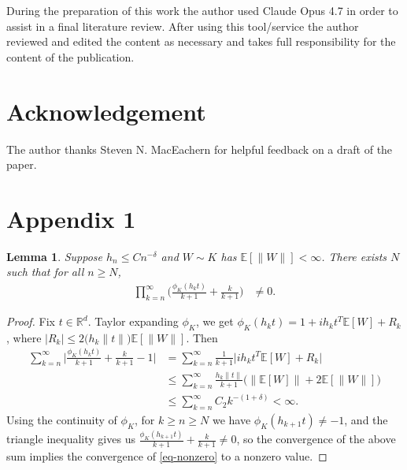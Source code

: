 \documentclass[12pt]{article}
\newtheorem{lemma}{Lemma}
\newcommand{\R}{\mathbb{R}}
\newcommand{\E}{\mathbb{E}}
\begin{document}
During the preparation of this work the author used Claude Opus 4.7 in order to assist in a final literature review. After using this tool/service the author reviewed and edited the content as necessary and takes full responsibility for the content of the publication.


\section*{Acknowledgement}

The author thanks Steven N. MacEachern for helpful feedback on a draft of the paper.


\appendix

\section*{Appendix 1}

\begin{lemma}\label{lem-product}
Suppose $h_n \leq Cn^{-\delta}$ and $W \sim K$ has $\E[\|W\|] < \infty$. There exists $N$ such that for all $n \geq N$,
\begin{align}
    \prod_{k = n}^\infty \bigg(\frac{\phi_K(h_k t)}{k+1} + \frac{k}{k+1}\bigg) &\neq 0. \label{eq-nonzero}
\end{align}
\end{lemma}

\begin{proof}
Fix $t \in \R^d$. Taylor expanding $\phi_K$, we get $\phi_K(h_k t) = 1 + i h_k t^T\E[W] + R_k$, where $|R_k| \leq 2 \big(h_k\|t\|\big)\E[\|W\|]$. Then
\begin{align*}
    \sum_{k = n}^\infty \bigg|\frac{\phi_K(h_k t)}{k+1} + \frac{k}{k+1} - 1\bigg| &= \sum_{k = n}^\infty \frac{1}{k+1} \Big| ih_kt^T \E[W] + R_k\Big| \\
    &\leq \sum_{k = n}^\infty \frac{h_k \|t\|}{k+1}\Big(\|\E[W]\| + 2 \E[\|W\|]\Big) \\
    &\leq \sum_{k = n}^\infty C_2 k^{-(1+\delta)} < \infty.
\end{align*}
Using the continuity of $\phi_K$, for $k \geq n \geq N$ we have $\phi_K(h_{k+1} t) \neq -1$, and the triangle inequality gives us $\frac{\phi_K(h_{k + 1} t)}{k+1} + \frac{k}{k+1}\neq 0$, so the convergence of the above sum implies the convergence of \eqref{eq-nonzero} to a nonzero value.
\end{proof}





 
\end{document}
